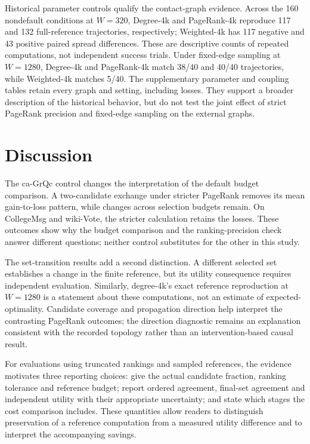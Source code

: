 \documentclass[smallextended]{svjour3}
\begin{document}
Historical parameter controls qualify the contact-graph evidence. Across the 160 nondefault conditions at $W=320$, Degree-4k and PageRank-4k reproduce 117 and 132 full-reference trajectories, respectively; Weighted-4k has 117 negative and 43 positive paired spread differences. These are descriptive counts of repeated computations, not independent success trials. Under fixed-edge sampling at $W=1280$, Degree-4k and PageRank-4k match 38/40 and 40/40 trajectories, while Weighted-4k matches 5/40. The supplementary parameter and coupling tables retain every graph and setting, including losses. They support a broader description of the historical behavior, but do not test the joint effect of strict PageRank precision and fixed-edge sampling on the external graphs.
\FloatBarrier

\section{Discussion}
The ca-GrQc control changes the interpretation of the default budget comparison. A two-candidate exchange under stricter PageRank removes its mean gain-to-loss pattern, while changes across selection budgets remain. On CollegeMsg and wiki-Vote, the stricter calculation retains the losses. These outcomes show why the budget comparison and the ranking-precision check answer different questions; neither control substitutes for the other in this study.

The set-transition results add a second distinction. A different selected set establishes a change in the finite reference, but its utility consequence requires independent evaluation. Similarly, degree-4k's exact reference reproduction at $W=1280$ is a statement about these computations, not an estimate of expected-optimality. Candidate coverage and propagation direction help interpret the contrasting PageRank outcomes; the direction diagnostic remains an explanation consistent with the recorded topology rather than an intervention-based causal result.

For evaluations using truncated rankings and sampled references, the evidence motivates three reporting choices: give the actual candidate fraction, ranking tolerance and reference budget; report ordered agreement, final-set agreement and independent utility with their appropriate uncertainty; and state which stages the cost comparison includes. These quantities allow readers to distinguish preservation of a reference computation from a measured utility difference and to interpret the accompanying savings.
\end{document}
